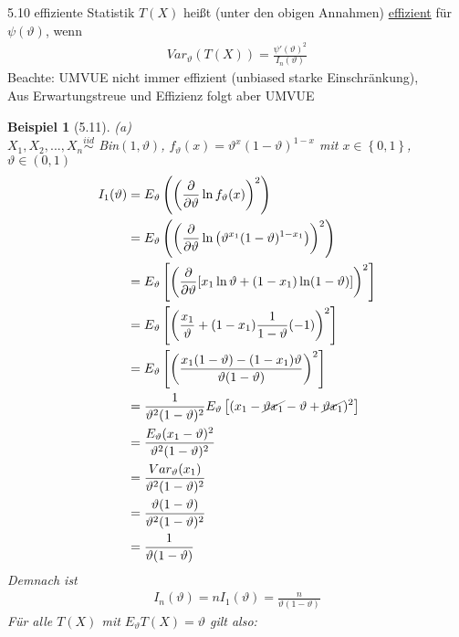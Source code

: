 \documentclass[a4paper,openany]{book}
\theoremstyle{mytheoremstyle}
\newtheorem*{bei}{Beispiel}
\theoremstyle{mytheoremstyle2}
\begin{document}
\begin{defi}{5.10 effiziente Statistik}{}
  $T(X)$ heißt (unter den obigen Annahmen) \underline{effizient} für $\psi (\vartheta )$, wenn 
  \begin{align*}
    Var _{\vartheta }(T(X))=\frac{\psi'(\vartheta )^2}{I_n(\vartheta )}
  \end{align*}
  Beachte: UMVUE nicht immer effizient (unbiased starke Einschränkung), \\
  Aus Erwartungstreue und Effizienz folgt aber UMVUE
\end{defi}
\begin{bei}[5.11]
  (a) \\
  $X_1,X_2,...,X_n \overset{iid}\sim$ Bin$(1,\vartheta )$, $f _{\vartheta }(x)=\vartheta ^x(1-\vartheta )^{1-x}$ mit $x \in \left\{0,1\right\}$, $\vartheta \in (0,1)$  
  \begin{align*}
    I_1(\vartheta )
    &=E _{\vartheta }\left(\left(\frac{\partial }{\partial \vartheta }\ln f _{\vartheta }(x)\right)^2\right) \\
    &=E _{\vartheta }\left(\left(\frac{\partial }{\partial \vartheta }\ln \left(\vartheta ^{x_1}(1-\vartheta )^{1-x_1}\right)\right)^2\right)\\
    &=E _{\vartheta }\left[\left(\frac{\partial }{\partial \vartheta }[x_1\ln \vartheta +(1-x_1)\ln(1-\vartheta )]\right)^2\right] \\
    &= E _{\vartheta }\left[\left(\frac{x_1}{\vartheta }+(1-x_1)\frac{1}{1-\vartheta }(-1)\right)^2\right] \\
    &=E _{\vartheta }\left[\left(\frac{x_1(1-\vartheta )-(1-x_1)\vartheta }{\vartheta (1-\vartheta )}\right)^2\right] \\
    &=\frac{1}{\vartheta ^2(1-\vartheta )^2}E _{\vartheta }\left[(x_1-\cancel{\vartheta x_1}-\vartheta +\cancel{\vartheta x_1})^2\right] \\
    &=\frac{E _{\vartheta }(x_1-\vartheta )^2}{\vartheta ^2(1-\vartheta )^2} \\
    &=\frac{Var _{\vartheta} (x_1)}{\vartheta ^2(1-\vartheta )^2} \\
    &=\frac{\vartheta (1-\vartheta )}{\vartheta ^2(1-\vartheta )^2} \\
    &=\frac{1}{\vartheta (1-\vartheta )}
  \end{align*}
  Demnach ist 
  \begin{align*}
    I_n (\vartheta )=n I_1(\vartheta )=\frac{n}{\vartheta (1-\vartheta )}
  \end{align*}
  Für alle $T(X)$ mit $E _{\vartheta }T(X)=\vartheta $ gilt also:

\end{bei}
\end{document}
